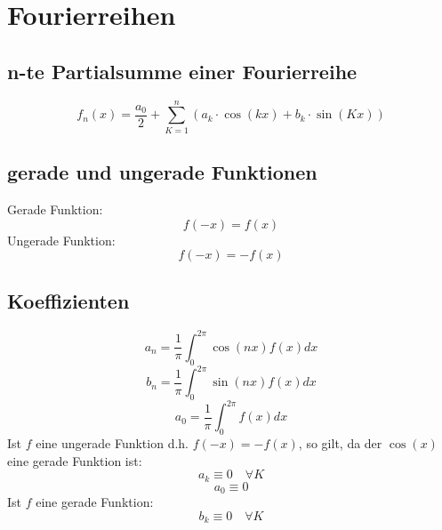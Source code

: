 \section{Fourierreihen}
\subsection{n-te Partialsumme einer Fourierreihe}
\[ \boxed{f_n(x) = \frac{a_0}{2} + \sum_{K=1}^n \left(a_k \cdot \cos(kx) + b_k \cdot \sin(Kx)\right)} \]
\subsection{gerade und ungerade Funktionen}
Gerade Funktion: 
\[ \boxed{f(-x) = f(x)} \]
Ungerade Funktion: 
\[ \boxed{f(-x) = -f(x)} \]
\subsection{Koeffizienten}
\[ \boxed{a_n = \frac{1}{\pi} \int_0^{2 \pi} \cos(nx) f(x) dx} \]
\[ \boxed{b_n = \frac{1}{\pi} \int_0^{2 \pi} \sin(nx) f(x) dx} \]
\[ \boxed{a_0 = \frac{1}{\pi} \int_0^{2 \pi} f(x) dx
} \]
Ist $f$ eine ungerade Funktion d.h. $f(-x) = -f(x)$, so gilt, da der $\cos(x)$ eine gerade Funktion ist: 
\[ a_k \equiv 0 \quad \forall K\]
\[ a_0 \equiv 0 \]
Ist $f$ eine gerade Funktion: 
\[ b_k \equiv 0 \quad \forall K \]